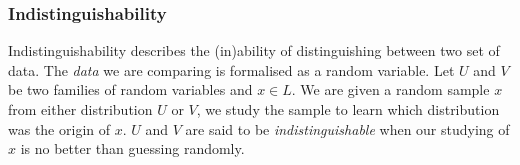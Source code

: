 \subsubsection{Indistinguishability}
Indistinguishability describes the (in)ability of distinguishing between two set of data. The \textit{data} we are comparing is formalised as a random variable.
\bigskip
\newline
Let $U$ and $V$ be two families of random variables and $x \in L$.
We are given a random sample $x$ from either distribution $U$ or $V$, we study the sample to learn which distribution was the origin of $x$.
$U$ and $V$ are said to be \textit{indistinguishable} when our studying of $x$ is no better than guessing randomly.
%

%
%
%


%
%

